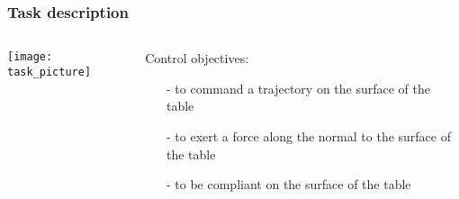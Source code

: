 \begin{frame}
  \frametitle{Task description}
  \begin{columns}
    \begin{column}{0.45\textwidth}
      \centering
      \texttt{[image: task\_picture]}
    \end{column}
    \begin{column}{0.5\textwidth}
      Control objectives:
      \begin{itemize}
      \item[-] to command a trajectory on the surface of the table
      \item[-] to exert a force along the normal to the surface of the table
      \item[-] to be compliant on the surface of the table
      \end{itemize}
    \end{column}
  \end{columns}
\end{frame}
